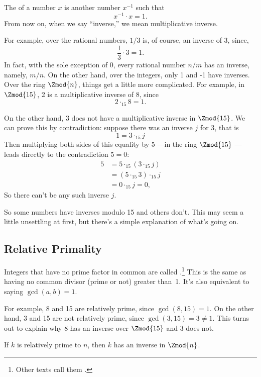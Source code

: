 The  of a number $x$ is another number
$x^{-1}$ such that
\[
x^{-1} \cdot x  = 1.
\]
From now on, when we say ``inverse,'' we mean multiplicative inverse.

For example, over the rational numbers, $1 / 3$ is, of course, an
inverse of 3, since,
\[
\frac{1}{3} \cdot 3 = 1.
\]
In fact, with the sole exception of 0, every rational number $n/m$ has
an inverse, namely, $m/n$.  On the other hand, over the integers, only
1 and -1 have inverses.  Over the ring $\Zmod{n}$, things get a little
more complicated.  For example, in $\Zmod{15}$, 2 is a multiplicative
inverse of 8, since
\[
2 \cdot_{15} 8 = 1.
\]

On the other hand, 3 does not have a multiplicative inverse in
$\Zmod{15}$.  We can prove this by contradiction: suppose there was an
inverse $j$ for 3, that is
\[
1 = 3 \cdot_{15} j
\]
Then multiplying both sides of this equality by 5 ---in the ring
$\Zmod{15}$ ---leads directly to the contradiction $5 = 0$:
\begin{align*}
5 & = 5 \cdot_{15} (3 \cdot_{15} j)\\
  & = (5 \cdot_{15} 3) \cdot_{15} j\\
  & = 0 \cdot_{15} j = 0,
\end{align*}
So there can't be any such inverse $j$.

So some numbers have inverses modulo 15 and others don't.  This may seem
a little unsettling at first, but there's a simple explanation of
what's going on.

\subsection{Relative Primality}

Integers that have no prime factor in common are called
.\footnote{Other texts call them
  .}  This is the same as having no common divisor
(prime or not) greater than~1.  It's also equivalent to saying
$\gcd(a, b) = 1$.

For example, 8 and 15 are relatively prime, since $\gcd(8, 15) = 1$.
On the other hand, 3 and 15 are not relatively prime, since $\gcd(3,
15) = 3 \neq 1$.  This turns out to explain why 8 has an inverse over
$\Zmod{15}$ and 3 does not.

\begin{lemma}\label{lem:inverse-arb} If $k$ is relatively prime to
$n$, then $k$ has an inverse in $\Zmod{n}$.
\end{lemma}

